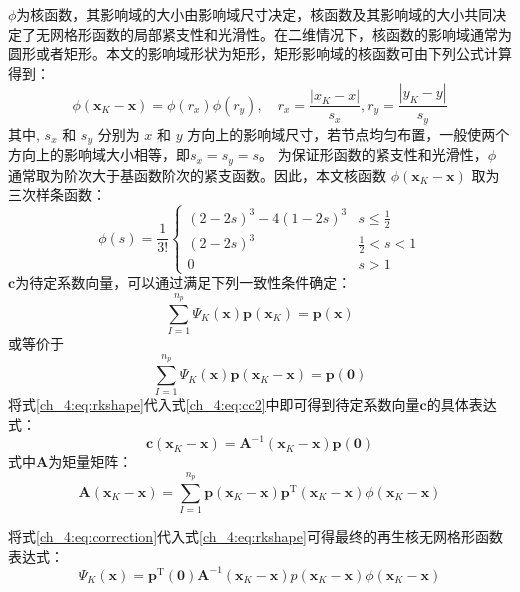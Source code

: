 $\phi$为核函数，其影响域的大小由影响域尺寸决定，核函数及其影响域的大小共同决定了无网格形函数的局部紧支性和光滑性。在二维情况下，核函数的影响域通常为圆形或者矩形。本文的影响域形状为矩形，矩形影响域的核函数可由下列公式计算得到：
\begin{equation}
    \phi(\boldsymbol x_K-\boldsymbol x) = \phi(r_x) \phi(r_y), \quad r_x = \frac{|x_K - x|}{s_{x}},r_y = \frac{| y_K -  y|}{s_{y}}
\end{equation}
其中, $s_x$ 和 $s_y$ 分别为 $x$ 和 $y$ 方向上的影响域尺寸，若节点均匀布置，一般使两个方向上的影响域大小相等，即$s_x = s_y = s$。
为保证形函数的紧支性和光滑性，$\phi$ 通常取为阶次大于基函数阶次的紧支函数。因此，本文核函数 $\phi(\boldsymbol x_K-\boldsymbol x)$ 取为三次样条函数：
\begin{equation}
    \phi(s) =\frac{1}{3!} \begin{cases}
        (2-2s)^3 - 4(1-2s)^3 & s\le\frac{1}{2} \\
        (2-2s)^3 &\frac{1}{2}<s<1 \\
        0 & s> 1
    \end{cases}
\end{equation}
$\boldsymbol c$为待定系数向量，可以通过满足下列一致性条件确定：
\begin{equation}\label{ch_4:eq:cc1}
    \sum_{I=1}^{n_p}\Psi_K(\boldsymbol x) \boldsymbol p(\boldsymbol x_K) = \boldsymbol p (\boldsymbol x)
\end{equation}
或等价于
\begin{equation}\label{ch_4:eq:cc2}
    \sum_{I=1}^{n_p}\Psi_K(\boldsymbol x) \boldsymbol p(\boldsymbol x_K-\boldsymbol x) = \boldsymbol p(\boldsymbol 0)
\end{equation}
将式\eqref{ch_4:eq:rkshape}代入式\eqref{ch_4:eq:cc2}中即可得到待定系数向量$\boldsymbol c$的具体表达式：
\begin{equation}\label{ch_4:eq:correction}
    \boldsymbol c(\boldsymbol x_K-\boldsymbol x) = \boldsymbol A^{-1}(\boldsymbol x_K-\boldsymbol x)\boldsymbol p(\boldsymbol 0)
\end{equation}
式中$\boldsymbol A$为矩量矩阵：
\begin{equation}
    \boldsymbol A(\boldsymbol x_K-\boldsymbol x) = \sum_{I=1}^{n_p}\boldsymbol p(\boldsymbol x_K-\boldsymbol x) \boldsymbol p^{\mathrm{T}}(\boldsymbol x_K-\boldsymbol x)\phi(\boldsymbol x_K-\boldsymbol x)
\end{equation}

将式\eqref{ch_4:eq:correction}代入式\eqref{ch_4:eq:rkshape}可得最终的再生核无网格形函数表达式：
\begin{equation}\label{ch_4:eq:mfshapefunction}
    \Psi_K(\boldsymbol x) = \boldsymbol p^{\mathrm{T}}(\boldsymbol 0) \boldsymbol A^{-1}(\boldsymbol x_K-\boldsymbol x)p(\boldsymbol x_K-\boldsymbol x)\phi(\boldsymbol x_K-\boldsymbol x)
\end{equation}

